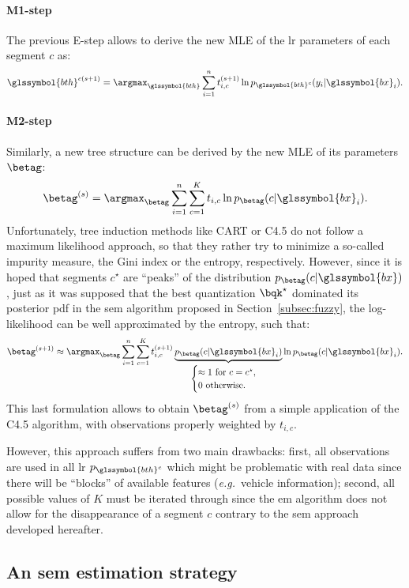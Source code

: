 \paragraph{M1-step}
The previous E-step allows to derive the new MLE of the \gls{lr} parameters of each segment $c$ as:
\[ \glssymbol{bth}^{c(s+1)} = \argmax_{\glssymbol{bth}} \sum_{i=1}^n t_{i,c}^{(s+1)} \ln p_{\glssymbol{bth}^c}(y_i | \glssymbol{bx}_i). \]

\paragraph{M2-step}
Similarly, a new tree structure can be derived by the new MLE of its parameters $\betag$:
\[ \betag^{(s)} = \argmax_{\betag} \sum_{i=1}^n \sum_{c=1}^K t_{i,c} \ln p_{\betag}( c | \glssymbol{bx}_i). \]
Unfortunately, tree induction methods like CART or C4.5 do not follow a maximum likelihood approach, so that they rather try to minimize a so-called impurity measure, the Gini index or the entropy, respectively. However, since it is hoped that segments $c^\star$ are ``peaks'' of the distribution $p_{\betag}( c | \glssymbol{bx})$, just as it was supposed that the best quantization $\bqk^\star$ dominated its posterior \gls{pdf} in the \gls{sem} algorithm proposed in Section~\ref{subsec:fuzzy}, the log-likelihood can be well approximated by the entropy, such that:
\[ \betag^{(s+1)} \approx \argmax_{\betag} \sum_{i=1}^n \sum_{c=1}^K t_{i,c}^{(s+1)} \underbrace{p_{\betag}( c | \glssymbol{bx}_i)}_{\begin{cases} \approx 1 \text{ for } c = c^\star, \\ 0 \text{ otherwise.} \end{cases}} \ln p_{\betag}( c | \glssymbol{bx}_i). \]
This last formulation allows to obtain $\betag^{(s)}$ from a simple application of the C4.5 algorithm, with observations properly weighted by $t_{i,c}$.

However, this approach suffers from two main drawbacks: first, all observations are used in all \gls{lr} $p_{\glssymbol{bth}^c}$ which might be problematic with real data since there will be ``blocks'' of available features (\textit{e.g.}\ vehicle information); second, all possible values of $K$ must be iterated through since the \gls{em} algorithm does not allow for the disappearance of a segment $c$ contrary to the \gls{sem} approach developed hereafter.

\subsection{An \gls{sem} estimation strategy}

